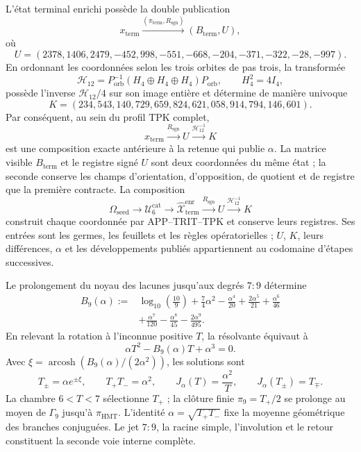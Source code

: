 \begin{proposition}
\label{prop:c27-registro-u-k-producido}
L'état terminal enrichi possède la double publication
\[
x_{\mathrm{term}}
\xrightarrow{(\pi_{\mathrm{term}},R_{\mathrm{sgn}})}
(B_{\mathrm{term}},U),
\]
où
\[
U=(2378,1406,2479,-452,998,-551,
-668,-204,-371,-322,-28,-997).
\]
En ordonnant les coordonnées selon les trois orbites de pas trois, la transformée
\[
\mathcal H_{12}
=P_{\mathrm{orb}}^{-1}(H_4\oplus H_4\oplus H_4)P_{\mathrm{orb}},
\qquad H_4^2=4I_4,
\]
possède l'inverse \(\mathcal H_{12}/4\) sur son image entière et détermine
de manière univoque
\[
K=(234,543,140,729,659,824,621,058,914,794,146,601).
\]
Par conséquent, au sein du profil TPK complet,
\[
x_{\mathrm{term}}\xrightarrow{R_{\mathrm{sgn}}}U
\xrightarrow{\mathcal H_{12}^{-1}}K
\]
est une composition exacte antérieure à la retenue qui publie \(\alpha\). La matrice
visible \(B_{\mathrm{term}}\) et le registre signé \(U\) sont deux
coordonnées du même état ; la seconde conserve les champs d'orientation,
d'opposition, de quotient et de registre que la première contracte. La composition
\[
 \Omega_{\mathrm{seed}}\longrightarrow
 \mathcal U_6^{\mathrm{cat}}\longrightarrow
 \widehat{\mathcal X}^{\mathrm{enr}}_{\mathrm{term}}
 \xrightarrow{R_{\mathrm{sgn}}}U
 \xrightarrow{\mathcal H_{12}^{-1}}K
\]
construit chaque coordonnée par APP--TRIT--TPK et conserve leurs registres. Ses
entrées sont les germes, les feuillets et les règles opératorielles ; \(U\), \(K\),
leurs différences, \(\alpha\) et les développements publiés appartiennent au
codomaine d'étapes successives.
\end{proposition}

\begin{theorem}
\label{thm:c27-alpha-segunda-via-bidireccional}
Le prolongement du noyau des lacunes jusqu'aux degrés \(7{:}9\) détermine
\[
\begin{aligned}
B_9(\alpha):={}&\log_{10}\!\left(\frac{10}{9}\right)
+\frac74\alpha^2-\frac{\alpha^4}{20}
+\frac{2\alpha^5}{21}+\frac{\alpha^6}{46}\\
&+\frac{\alpha^7}{120}-\frac{\alpha^8}{45}
-\frac{2\alpha^9}{495}.
\end{aligned}
\]
En relevant la rotation à l'inconnue positive \(T\), la résolvante équivaut à
\[
\boxed{\alpha T^2-B_9(\alpha)T+\alpha^3=0.}
\]
Avec
\(\xi=\operatorname{arcosh}(B_9(\alpha)/(2\alpha^2))\), les solutions sont
\[
T_\pm=\alpha e^{\pm\xi},
\qquad T_+T_-=\alpha^2,
\qquad
J_\alpha(T)=\frac{\alpha^2}{T},
\qquad J_\alpha(T_\pm)=T_\mp.
\]
La chambre \(6<T<7\) sélectionne \(T_+\) ; la clôture finie
\(\pi_9=T_+/2\) se prolonge au moyen de \(\Gamma_9\) jusqu'à
\(\pi_{\mathrm{HMT}}\). L'identité
\(\alpha=\sqrt{T_+T_-}\) fixe la moyenne géométrique des branches conjuguées.
Le jet \(7{:}9\), la racine simple, l'involution et le retour constituent la
seconde voie interne complète.
\end{theorem}

